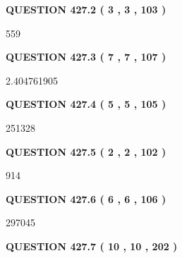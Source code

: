 \documentclass{ctexart}
\begin{document}
 
 
 
  
\vspace{0.2in}
  
{\textbf{\Large{QUESTION
427.2 
 ( 3 , 3 , 103 )
}}}
  
  
 
 
\noindent{}

559
 
 
  
\vspace{0.2in}
  
{\textbf{\Large{QUESTION
427.3 
 ( 7 , 7 , 107 )
}}}
  
  
 
 
\noindent{}

2.404761905
 
 
  
\vspace{0.2in}
  
{\textbf{\Large{QUESTION
427.4 
 ( 5 , 5 , 105 )
}}}
  
  
 
 
\noindent{}

251328
 
 
  
\vspace{0.2in}
  
{\textbf{\Large{QUESTION
427.5 
 ( 2 , 2 , 102 )
}}}
  
  
 
 
\noindent{}

914
 
 
  
\vspace{0.2in}
  
{\textbf{\Large{QUESTION
427.6 
 ( 6 , 6 , 106 )
}}}
  
  
 
 
\noindent{}

297045
 
 
  
\vspace{0.2in}
  
{\textbf{\Large{QUESTION
427.7 
 ( 10 , 10 , 202 )
}}}
  
\end{document}
